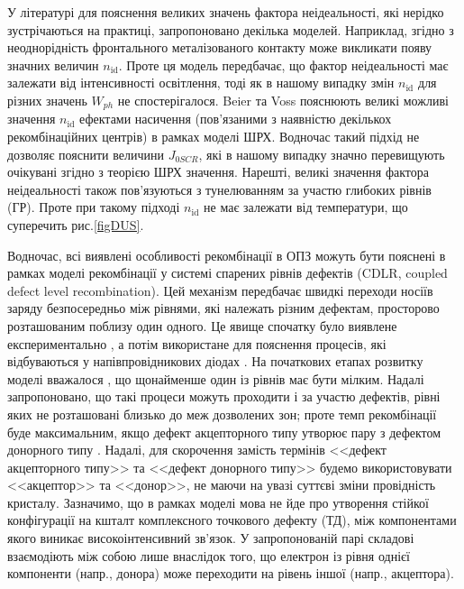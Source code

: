 У літературі для пояснення великих значень фактора неідеальності, які нерідко зустрічаються на практиці,
запропоновано декілька моделей.
Наприклад, згідно з \cite{Heide} неоднорідність фронтального металізованого контакту може викликати появу значних величин $n_\mathrm{id}$.
Проте ця модель передбачає, що фактор неідеальності має залежати від інтенсивності освітлення, тоді як в нашому випадку змін $n_\mathrm{id}$ для різних
значень $W_{ph}$ не спостерігалося.
Beier та Voss \cite{Beier} пояснюють великі можливі значення $n_\mathrm{id}$ ефектами насичення (пов'язаними з наявністю декількох
рекомбінаційних центрів) в рамках моделі ШРХ.
Водночас такий підхід не дозволяє пояснити величини $J_{0SCR}$, які в нашому випадку значно перевищують очікувані згідно з теорією ШРХ значення.
Нарешті, великі значення фактора неідеальності також пов'язуються з тунелюванням за участю глибоких рівнів (ГР)\cite{Shah,Kaminski_n}.
Проте при такому підході $n_\mathrm{id}$ не має залежати від температури, що суперечить рис.\ref{figDUS}.

Водночас, всі виявлені особливості рекомбінації в ОПЗ можуть бути пояснені в рамках
моделі рекомбінації у системі спарених рівнів дефектів (CDLR, coupled defect level recombination).
Цей механізм передбачає швидкі переходи носіїв заряду безпосередньо між рівнями, які належать різним дефектам,
просторово розташованим поблизу один одного.
Це явище спочатку було виявлене експериментально \cite{DAPR:Chen1991,DAPR:Chen1994},
а потім використане для пояснення процесів, які відбуваються у напівпровідникових діодах \cite{CDLR:JAP1995,CDLR:JAP,CDLR:SSP,Breitenstein2013,CDLR:SupMicr}.
На початкових етапах розвитку моделі вважалося \cite{CDLR:JAP1995}, що щонайменше один із рівнів має бути
мілким.
Надалі запропоновано, що такі процеси можуть проходити і за участю дефектів, рівні яких не розташовані близько до меж дозволених зон;
проте темп рекомбінації буде максимальним, якщо дефект акцепторного типу утворює пару з дефектом донорного типу \cite{CDLR:JAP}.
Надалі, для скорочення замість термінів <<дефект акцепторного типу>> та <<дефект донорного типу>>
будемо використовувати <<акцептор>> та <<донор>>, не маючи на увазі суттєві зміни провідність кристалу.
Зазначимо, що в рамках моделі мова не йде про утворення стійкої конфігурації на кшталт комплексного точкового дефекту (ТД),
між компонентами якого виникає високоінтенсивний зв'язок.
У запропонованій парі
складові взаємодіють
між собою лише внаслідок того, що електрон із рівня однієї компоненти (напр., донора) може переходити на рівень іншої (напр., акцептора).

